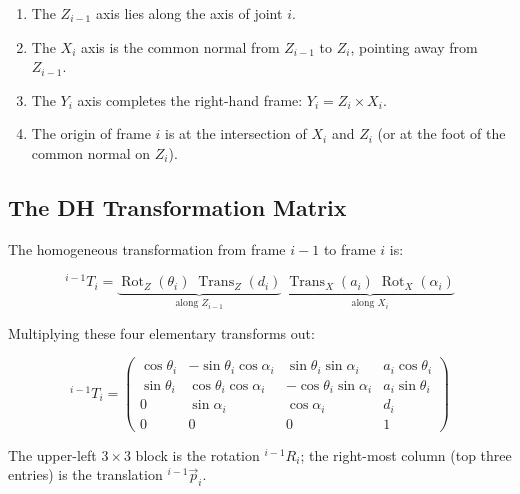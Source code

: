 \documentclass[12pt,a4paper]{article}
\begin{document}
\begin{keybox}
\begin{enumerate}
  \item The $Z_{i-1}$ axis lies along the axis of joint $i$.
  \item The $X_i$ axis is the common normal from $Z_{i-1}$ to $Z_i$,
        pointing away from $Z_{i-1}$.
  \item The $Y_i$ axis completes the right-hand frame:
        $Y_i = Z_i \times X_i$.
  \item The origin of frame $i$ is at the intersection of $X_i$ and
        $Z_i$ (or at the foot of the common normal on $Z_i$).
\end{enumerate}
\end{keybox}

\subsection{The DH Transformation Matrix}

The homogeneous transformation from frame $i{-}1$ to frame $i$ is:

\begin{equation}
\boxed{
  {}^{i-1}T_i =
  \underbrace{
    \operatorname{Rot}_{Z}(\theta_i)\;
    \operatorname{Trans}_{Z}(d_i)
  }_{\text{along }Z_{i-1}}
  \;
  \underbrace{
    \operatorname{Trans}_{X}(a_i)\;
    \operatorname{Rot}_{X}(\alpha_i)
  }_{\text{along }X_i}
}
\label{eq:DH-decomp}
\end{equation}

Multiplying these four elementary transforms out:

\begin{equation}
\boxed{
  {}^{i-1}T_i =
  \begin{pmatrix}
    \cos\theta_i & -\sin\theta_i\cos\alpha_i &
      \sin\theta_i\sin\alpha_i  & a_i\cos\theta_i \\[3pt]
    \sin\theta_i &  \cos\theta_i\cos\alpha_i &
      -\cos\theta_i\sin\alpha_i & a_i\sin\theta_i \\[3pt]
    0 & \sin\alpha_i & \cos\alpha_i & d_i \\[3pt]
    0 & 0 & 0 & 1
  \end{pmatrix}
}
\label{eq:DH-matrix}
\end{equation}

The upper-left $3\times3$ block is the rotation ${}^{i-1}R_i$; the
right-most column (top three entries) is the translation
${}^{i-1}\vec{p}_i$.
\end{document}

